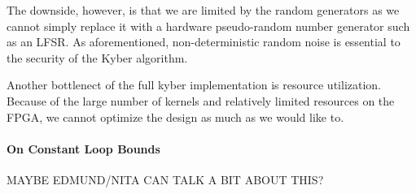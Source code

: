 The downside, however, is that we are limited by the random generators as we cannot simply replace it with a hardware
pseudo-random number generator such as an LFSR. As aforementioned, non-deterministic random noise is essential to the
security of the Kyber algorithm. 

Another bottlenect of the full kyber implementation is resource utilization. Because of the large number of kernels
and relatively limited resources on the FPGA,
we cannot optimize the design as much as we would like to. 

\paragraph{On Constant Loop Bounds}

MAYBE EDMUND/NITA CAN TALK A BIT ABOUT THIS?